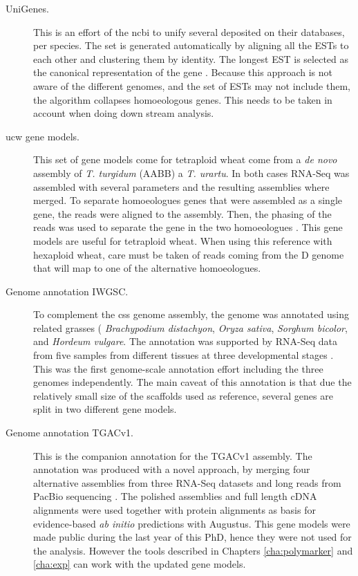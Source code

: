 \begin{description}
\item[UniGenes.] This is an effort of the \gls{ncbi} to unify several  deposited on their databases, per species.
The set is generated automatically by aligning all the ESTs to each other and clustering them by identity. 
The longest EST is selected as the canonical representation of the gene \citep{PontiusJUWagnerL2002}. 
Because this approach is not aware of the different genomes, and the set of ESTs may not include them, the algorithm  collapses homoeologous genes. 
This needs to be taken in account when doing down stream analysis. 
\item[\acrshort{ucw} gene models.] This set of gene models come for tetraploid wheat come from a \textit{de novo} assembly of \textit{T. turgidum} (AABB) a \textit{T. urartu}. 
In both cases RNA-Seq was assembled with several parameters and the resulting assemblies where merged. 
To separate homoeologues genes that were assembled as a single gene, the reads were aligned to the assembly.
Then, the phasing of the reads was used to separate the gene in the two homoeologues \citep{Krasileva2013}.
This gene models are useful for tetraploid wheat. 
When using this reference with hexaploid wheat, care must be taken of reads coming from the D genome that will map to one of the alternative homoeologues. 
\item[Genome annotation IWGSC.] To complement the \acrshort{css} genome assembly, the genome was annotated using related grasses ( \textit{Brachypodium distachyon}, \textit{Oryza sativa}, \textit{Sorghum bicolor}, and \textit{Hordeum vulgare}. 
The annotation was supported by RNA-Seq data from five samples from different tissues at three developmental stages \citep{Mayer2014}. 
This was the first genome-scale annotation effort including the three genomes independently. 
The main caveat of this annotation is that due the relatively small size of the scaffolds used as reference, several genes are split in two different gene models. 
\item[Genome annotation TGACv1.] This is the companion annotation for the TGACv1 assembly. 
The annotation was produced with a novel approach, by merging four alternative assemblies from three RNA-Seq datasets and long reads from PacBio sequencing \citep{Venturini2016}. The polished assemblies and full length cDNA alignments were used together with protein alignments as basis for evidence-based \textit{ab initio} predictions with Augustus. 
This gene models were made public during the last year of this PhD, hence they were not used for the analysis. 
However the tools described in Chapters \ref{cha:polymarker} and \ref{cha:exp} can work with the updated gene models. 
\end{description}



